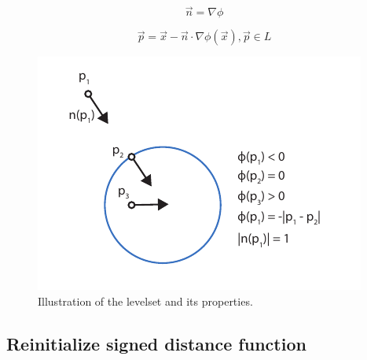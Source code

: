 \begin{equation}
\label{eq:normal2}
 \vec{n} = \nabla \phi
\end{equation} 

\begin{equation}
\label{eq:find_point}
 \vec{p} = \vec{x} - \vec{n} \cdot \nabla\phi(\vec{x}), \vec{p} \in L
\end{equation}

\begin{figure}[h!]
	\centering
		\includegraphics[width=.5 \linewidth]{figures/levelset.pdf}
	\caption{Illustration of the levelset and its properties.}
	\label{fig:levelset}
\end{figure}

\subsection{Reinitialize signed distance function}
